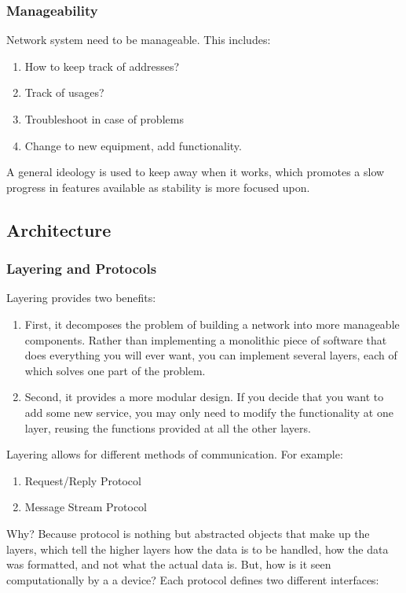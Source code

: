 \documentclass[11pt, a4paper]{article}
\begin{document}
\subsubsection{Manageability}
Network system need to be manageable. This includes:
\begin{enumerate}
    \item How to keep track of addresses?
    \item Track of usages?
    \item Troubleshoot in case of problems
    \item Change to new equipment, add functionality.
\end{enumerate}

A general ideology is used to keep away when it works, which promotes a slow progress in features available as stability is more focused upon.

\subsection{Architecture}
\subsubsection{Layering and Protocols}
Layering provides two benefits:
\begin{enumerate}
    \item First, it decomposes the problem of building a network into more manageable components. Rather than implementing a monolithic piece of software that does everything you will ever want, you can implement several layers, each of which solves one part of the problem. 
    \item Second, it provides a more modular design. If you decide that you want to add some new service, you may only need to modify the functionality at one layer, reusing the functions provided at all the other layers.
\end{enumerate}

Layering allows for different methods of communication. For example:
\begin{enumerate}
    \item Request/Reply Protocol
    \item Message Stream Protocol
\end{enumerate}
Why? Because protocol is nothing but abstracted objects that make up the layers, which tell the higher layers how the data is to be handled, how the data was formatted, and not what the actual data is. But, how is it seen computationally by a a device? Each protocol defines two different interfaces:
\end{document}
